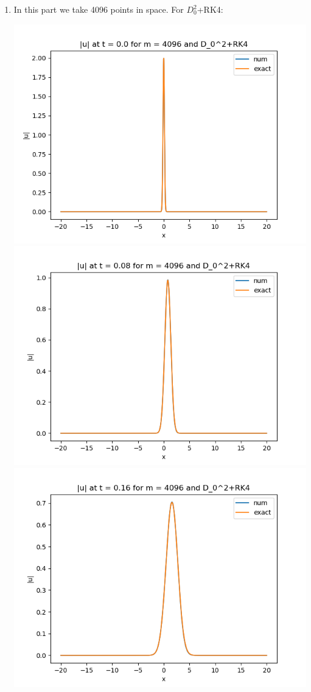 \documentclass{article}
\begin{document}
\begin{enumerate}[label=(\alph*)]
	
\item 
In this part we take 4096 points in space. For $D_0^2$+RK4:
\begin{center}
	\includegraphics[scale=.3]{FINAL u_abs t = 0.0 m = 4096 D02+RK4}
	\includegraphics[scale=.3]{FINAL u_abs t = 0.08 m = 4096 D02+RK4}
	\includegraphics[scale=.3]{FINAL u_abs t = 0.16 m = 4096 D02+RK4}

\end{center}
\end{enumerate}
\end{document}
